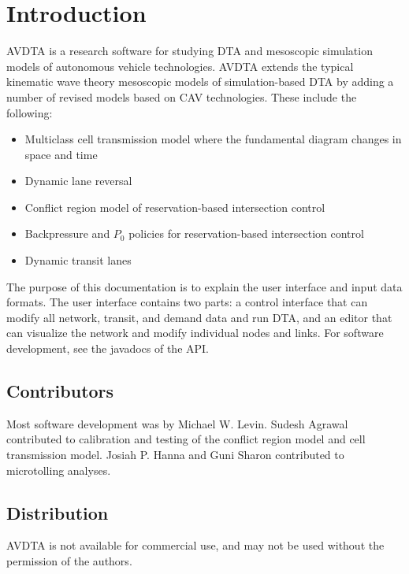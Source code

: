 \chapter{Introduction}

AVDTA is a research software for studying DTA and mesoscopic simulation models of autonomous vehicle technologies.
%
AVDTA extends the typical kinematic wave theory mesoscopic models of simulation-based DTA by adding a number of revised models based on CAV technologies. These include the following:
\begin{itemize}
	\item Multiclass cell transmission model where the fundamental diagram changes in space and time\cite{levin2016multiclass}
	\item Dynamic lane reversal\cite{levin2016cell, duell2016system}
	\item Conflict region model of reservation-based intersection control\cite{levin2015intersection, levin2015optimizing}
	\item Backpressure and $P_0$ policies for reservation-based intersection control
	\item Dynamic transit lanes
\end{itemize}

The purpose of this documentation is to explain the user interface and input data formats. The user interface contains two parts: a control interface that can modify all network, transit, and demand data and run DTA, and an editor that can visualize the network and modify individual nodes and links. For software development, see the javadocs of the API.

\section{Contributors}
Most software development was by Michael W. Levin. Sudesh Agrawal contributed to calibration and testing of the conflict region model and cell transmission model. Josiah P. Hanna and Guni Sharon contributed to microtolling analyses.

\section{Distribution}
 AVDTA is not available for commercial use, and may not be used without the permission of the authors.



